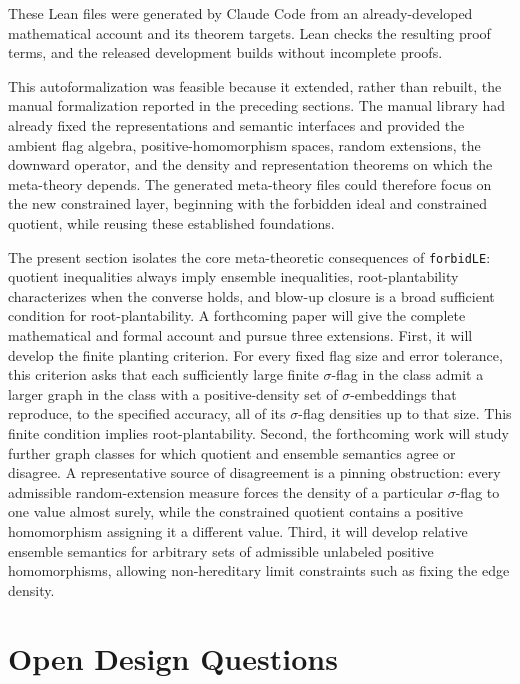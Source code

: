 \documentclass{article}
\newcommand{\lean}[1]{\texttt{#1}}
\begin{document}
These Lean files were generated by Claude Code from an already-developed
mathematical account and its theorem targets.  Lean checks the resulting proof
terms, and the released development builds without incomplete proofs.

This autoformalization was feasible because it extended, rather than rebuilt,
the manual formalization reported in the preceding sections.  The manual
library had already fixed the representations and semantic interfaces and
provided the ambient flag algebra, positive-homomorphism spaces, random
extensions, the downward operator, and the density and representation
theorems on which the meta-theory depends.  The generated meta-theory files
could therefore focus on the new constrained layer, beginning with the
forbidden ideal and constrained quotient, while reusing these established
foundations.

The present section isolates the core meta-theoretic consequences of
\lean{forbidLE}: quotient inequalities always imply ensemble inequalities,
root-plantability characterizes when the converse holds, and blow-up closure
is a broad sufficient condition for root-plantability.  A forthcoming paper
will give the complete mathematical and formal account and pursue three
extensions.  First, it will develop the finite planting criterion.  For every
fixed flag size and error tolerance, this criterion asks that each sufficiently
large finite \(\sigma\)-flag in the class admit a larger graph in the class
with a positive-density set of \(\sigma\)-embeddings that reproduce, to the
specified accuracy, all of its \(\sigma\)-flag densities up to that size.
This finite condition implies root-plantability.  Second, the forthcoming
work will study further graph classes for which quotient and ensemble
semantics agree or disagree.  A representative source of disagreement is a
pinning obstruction: every admissible random-extension measure forces the
density of a particular \(\sigma\)-flag to one value almost surely, while the
constrained quotient contains a positive homomorphism assigning it a
different value.  Third, it will develop relative ensemble semantics for
arbitrary sets of admissible unlabeled positive homomorphisms, allowing
non-hereditary limit constraints such as fixing the edge density.

\section{Open Design Questions}
\label{sec:unsure}
\end{document}
